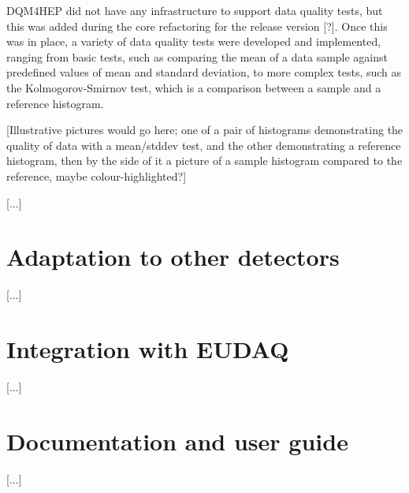 DQM4HEP did not have any infrastructure to support data quality tests, but this was added during the core refactoring for the release version [?]. Once this was in place, a variety of data quality tests were developed and implemented, ranging from basic tests, such as comparing the mean of a data sample against predefined values of mean and standard deviation, to more complex tests, such as the Kolmogorov-Smirnov test, which is a comparison between a sample and a reference histogram.

[Illustrative pictures would go here; one of a pair of histograms demonstrating the quality of data with a mean/stddev test, and the other demonstrating a reference histogram, then by the side of it a picture of a sample histogram compared to the reference, maybe colour-highlighted?]

[...]

\section{Adaptation to other detectors}
[...]

\section{Integration with EUDAQ}
[...]

\section{Documentation and user guide}
[...]
